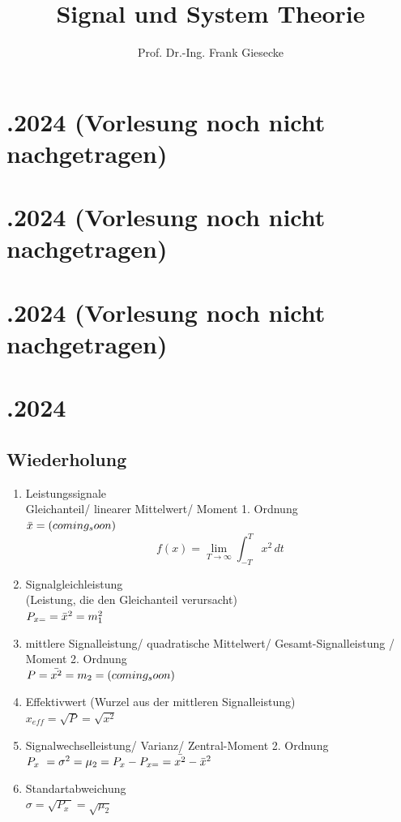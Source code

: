 \documentclass{article}
\title{Signal und System Theorie}
\author{Prof. Dr.-Ing. Frank Giesecke}
\date{}
\begin{document}
\maketitle


\newpage
\section*{.2024 (Vorlesung noch nicht nachgetragen)}
\section*{.2024 (Vorlesung noch nicht nachgetragen)}
\section*{.2024 (Vorlesung noch nicht nachgetragen)}


\newpage
\section*{.2024}
\subsection*{Wiederholung}
\begin{enumerate}
	\item Leistungssignale \\
	Gleichanteil/ linearer Mittelwert/ Moment 1. Ordnung \\
	$\Bar{x} = (coming_soon)$
	\[ f(x) = \lim_{T\to\infty} \int_{-T}^{T} x^2 \,dt \]

	\item Signalgleichleistung \\
	(Leistung, die den Gleichanteil verursacht) \\
	$P_{x=} = \Bar{x}^2 = m_1^2$

	\item mittlere Signalleistung/ quadratische Mittelwert/ Gesamt-Signalleistung / Moment 2. Ordnung \\
	$P = \Bar{x^2} = m_2 = (coming_soon)$

	\item Effektivwert (Wurzel aus der mittleren Signalleistung) \\
	$x_{eff}=\sqrt{P}=\sqrt{x^2}$

	\item Signalwechselleistung/ Varianz/ Zentral-Moment 2. Ordnung \\
	$P_{x~}=\sigma^2 = \mu_2 = P_x - P_{x=} = \Bar{x^2} - \Bar{x}^2$

	\item Standartabweichung \\
	$\sigma = \sqrt{P_{x~}} = \sqrt{\mu_2}$
\end{enumerate}
\end{document}
